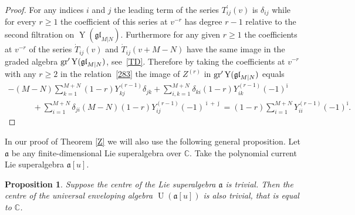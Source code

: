 \documentclass[pdftex]{sigma}
\numberwithin{equation}{section}
\newtheorem{Proposition}[Theorem]{Proposition}
\def\a{\mathfrak{a}}
\def\bi{{\bar\imath }}
\def\bj{{\bar\jmath }}
\def\CC{{\mathbb{C}}}
\def\de{\delta}
\def\ge{\geqslant}
\def\glMN{\mathfrak{gl}_{M|N}}
\def\grpr{{\rm gr}^{\prime} }
\def\TD{\dot{T}}
\def\TP{T^{\prime}}
\def\Ua{\operatorname{U}(\a [u])}
\def\YMN{\operatorname{Y}(\glMN)}
\begin{document}
\begin{proof}
For any indices $i$ and $j$ the leading term of the series $\TP_{ij}(v)$
is $\de_{ij}$ while for every $r\ge1$ the coefficient of this series at
$v^{-r}$ has degree $r-1$ relative to the second filtration on $\YMN $.
Furthermore for any given $r\ge1$
the coefficients at $v^{-r}$ of the series
$\TD_{ij}(v)$ and $\TD_{ij}(v+M-N)$ have the same image
in the graded algebra $\grpr\YMN $, see~\eqref{TD}.
Therefore by
taking the coefficients at $v^{-r}$ with any $r\ge2$
in the relation~\eqref{283}
the image of $Z^{(r)}$ in $\grpr\YMN$ equals
\begin{gather*}
 -(M-N)\sum_{k=1}^{M+N}(1-r) Y^{(r-1)}_{kj} \de_{jk} +
\sum_{i,k=1}^{M+N}
\de_{ki} (1-r) Y^{(r-1)}_{ik} (-1)^{\bi}\\
\qquad\quad{} +
\sum_{i=1}^{M+N}
\de_{ji} (M-N) (1-r) Y^{(r-1)}_{ij} (-1)^{\bi+ \bj}
=
( 1-r ) \sum_{i=1}^{M+N} Y^{(r-1)}_{ii} (-1)^{\bi} .
\tag*{\qed}
\end{gather*}
\renewcommand{\qed}{}
\end{proof}

In our proof of Theorem \ref{Z} we will also use the following general
proposition.
Let $\a$ be any finite-dimensional Lie superalgebra over $\CC$.
Take the %
polynomial current Lie superalgebra $\a [u] $.

\begin{Proposition}
\label{L27}
Suppose the centre of the Lie superalgebra $\a$ is trivial.
Then the centre of the universal enveloping algebra $\Ua$
is also trivial, that is equal to $\CC $.
\end{Proposition}
\end{document}
